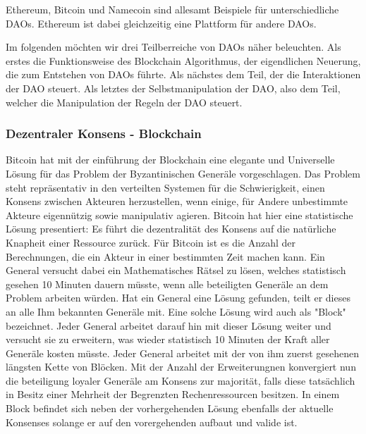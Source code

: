 \documentclass[a4paper,12pt]{report}
\begin{document}
Ethereum, Bitcoin und Namecoin sind allesamt Beispiele für unterschiedliche DAOs. Ethereum ist dabei gleichzeitig eine Plattform für andere DAOs.

Im folgenden möchten wir drei Teilberreiche von DAOs näher beleuchten. Als erstes die Funktionsweise des Blockchain Algorithmus, der eigendlichen Neuerung, die zum Entstehen von DAOs führte. Als nächstes dem Teil, der die Interaktionen der DAO steuert. Als letztes der Selbstmanipulation der DAO, also dem Teil, welcher die Manipulation der Regeln der DAO steuert.


\subsubsection*{Dezentraler Konsens - Blockchain}

Bitcoin hat mit der einführung der Blockchain eine elegante und Universelle Lösung für das Problem der Byzantinischen Generäle vorgeschlagen. Das Problem steht repräsentativ in den verteilten Systemen für die Schwierigkeit, einen Konsens zwischen Akteuren herzustellen, wenn einige, für Andere unbestimmte Akteure eigennützig sowie manipulativ agieren. 
Bitcoin hat hier eine statistische Lösung presentiert: Es führt die dezentralität des Konsens auf die natürliche Knapheit einer Ressource zurück. Für Bitcoin ist es die Anzahl der Berechnungen, die ein Akteur in einer bestimmten Zeit machen kann. Ein General versucht dabei ein Mathematisches Rätsel zu lösen, welches statistisch gesehen 10 Minuten dauern müsste, wenn alle beteiligten Generäle an dem Problem arbeiten würden. Hat ein General eine Lösung gefunden, teilt er dieses an alle Ihm bekannten Generäle mit. Eine solche Lösung wird auch als "Block" bezeichnet. Jeder General arbeitet darauf hin mit dieser Lösung weiter und versucht sie zu erweitern, was wieder statistisch 10 Minuten der Kraft aller Generäle kosten müsste. Jeder General arbeitet mit der von ihm zuerst gesehenen längsten Kette von Blöcken. Mit der Anzahl der Erweiterungnen konvergiert nun die beteiligung loyaler Generäle am Konsens zur majorität, falls diese tatsächlich in Besitz einer Mehrheit der Begrenzten Rechenressourcen besitzen.
In einem Block befindet sich neben der vorhergehenden Lösung ebenfalls der aktuelle Konsenses solange er auf den vorergehenden aufbaut und valide ist.
\end{document}
